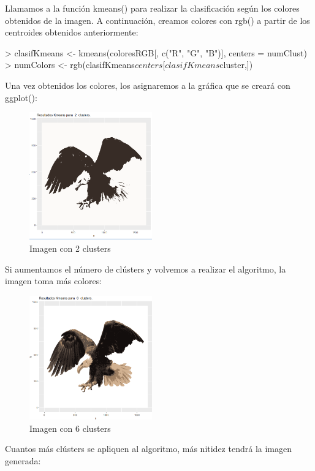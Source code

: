 \documentclass [a4paper] {article}
\begin{document}
Llamamos a la función kmeans() para realizar la clasificación según los colores obtenidos de la imagen. A continuación, creamos colores con rgb() a partir de los centroides obtenidos anteriormente:

\begin{Schunk}
\begin{Sinput}
> clasifKmeans <- kmeans(coloresRGB[, c("R", "G", "B")], centers = numClust)
> numColors <- rgb(clasifKmeans$centers[clasifKmeans$cluster,])
\end{Sinput}
\end{Schunk}

Una vez obtenidos los colores, los asignaremos a la gráfica que se creará con ggplot():

\begin{figure}[!htbp]
  \centering
  \includegraphics[width=200px,keepaspectratio]{./eagle2clusters.png}
  \caption{Imagen con 2 clusters}
  \label{fig:original}
\end{figure}


Si aumentamos el número de clústers y volvemos a realizar el algoritmo, la imagen toma más colores:

\begin{figure}[!htbp]
  \centering
  \includegraphics[width=200px,keepaspectratio]{./eagle6clusters.png}
  \caption{Imagen con 6 clusters}
  \label{fig:original}
\end{figure}

Cuantos más clústers se apliquen al algoritmo, más nitidez tendrá la imagen generada:
\end{document}
